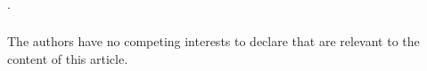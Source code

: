 \documentclass[runningheads]{llncs}
\begin{document}




\begin{credits}
\subsubsection{\ackname} .

\subsubsection{\discintname}
The authors have no competing interests to declare that are
relevant to the content of this article.
\end{credits}
%
%
%


%
\end{document}
